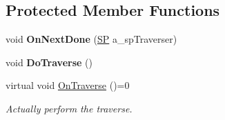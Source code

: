 \subsection*{Protected Member Functions}
\begin{DoxyCompactItemize}
\item 
\mbox{\label{class_i_graph_1_1_i_traverser_a4541a9328cfc10c09f706d90c1599392}} 
void {\bfseries On\+Next\+Done} (\hyperlink{class_i_graph_1_1_i_traverser_a5a5ccc81423d6024742d1898a310d812}{SP} a\+\_\+sp\+Traverser)
\item 
\mbox{\label{class_i_graph_1_1_i_traverser_ab88b7ab8a91dd79eb937af300318bc54}} 
void {\bfseries Do\+Traverse} ()
\item 
\mbox{\label{class_i_graph_1_1_i_traverser_ac6a46d894404636ce0ecd7eb73de9b42}} 
virtual void \hyperlink{class_i_graph_1_1_i_traverser_ac6a46d894404636ce0ecd7eb73de9b42}{On\+Traverse} ()=0
\begin{DoxyCompactList}\small\item\em Actually perform the traverse. \end{DoxyCompactList}\end{DoxyCompactItemize}
